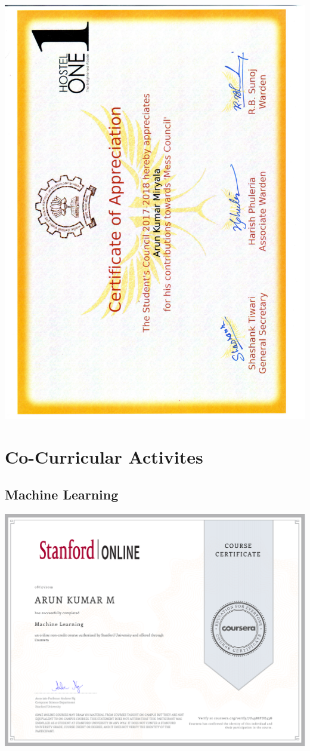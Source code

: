 \documentclass{article}
\begin{document}
	\includegraphics[page=1, scale=0.5]{proofs/mess_council.pdf}\\
\section{Co-Curricular Activites}
	\subsection{Machine Learning}
		\includegraphics[page=1, scale=0.5]{proofs/ML_certificate.pdf}\\
\end{document}
